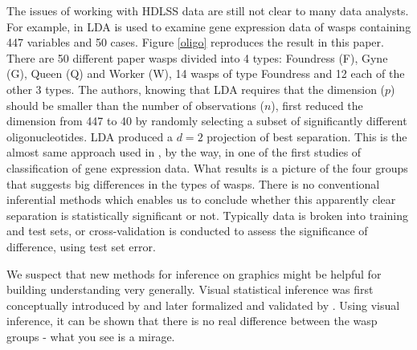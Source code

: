 The issues of working with HDLSS data are still not clear to many data analysts. For example, in \cite{toth:2010} LDA is used to examine gene expression data of wasps containing 447 variables and 50 cases. Figure \ref{oligo} reproduces the result in this paper. There are 50 different paper wasps divided into 4 types: Foundress (F), Gyne (G), Queen (Q) and Worker (W), 14  wasps of type Foundress and 12 each of the other 3 types. The authors, knowing that LDA requires that the dimension ($p$) should be smaller than the number of observations ($n$), first reduced the dimension from 447 to 40 by randomly selecting a subset of significantly different oligonucleotides. LDA produced a $d = 2$ projection of best separation. This is the almost same approach used in \cite{dudoit:2002}, by the way, in one of the first studies of classification of gene expression data. What results is a picture of the four groups that suggests big differences in the types of wasps. There is no conventional inferential methods which enables us to conclude whether this apparently clear separation is statistically significant or not. Typically data is broken into training and test sets, or cross-validation is conducted to assess the significance of difference, using test set error. 

We suspect that new methods for inference on graphics might be helpful for building understanding very generally. Visual statistical inference was first conceptually introduced by \cite{buja:2009} and later formalized and validated by \cite{majumder:2011}. Using visual inference, it can be shown that there is no real difference between the wasp groups - what you see is a mirage. 

